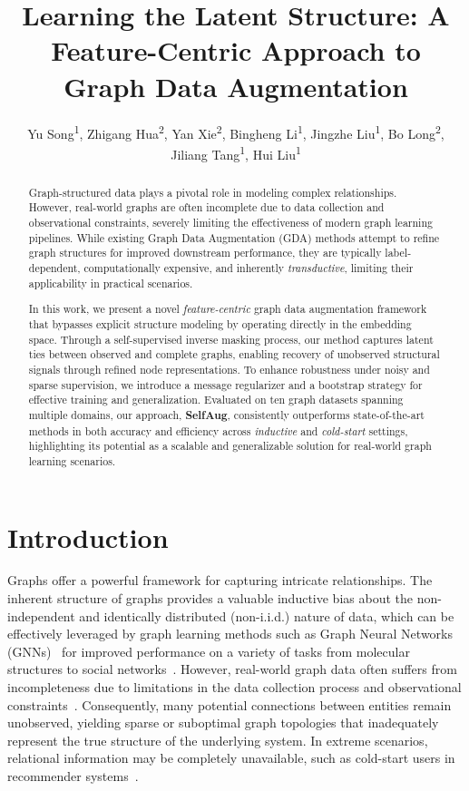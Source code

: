 \documentclass[letterpaper]{article} \usepackage{aaai2026}  \usepackage{times}  \usepackage{helvet}  \usepackage{courier}  \usepackage[hyphens]{url}  \usepackage{graphicx} \urlstyle{rm} \def\UrlFont{\rm}  \usepackage{natbib}  \usepackage{caption} \frenchspacing  \setlength{\pdfpagewidth}{8.5in}  \setlength{\pdfpageheight}{11in}
\title{Learning the Latent Structure: A Feature-Centric Approach to Graph Data Augmentation}
\author {
Yu Song\textsuperscript{\rm 1},
    Zhigang Hua\textsuperscript{\rm 2},
    Yan Xie\textsuperscript{\rm 2},
    Bingheng Li\textsuperscript{\rm 1},
    Jingzhe Liu\textsuperscript{\rm 1},
    Bo Long\textsuperscript{\rm 2},
    Jiliang Tang\textsuperscript{\rm 1},
    Hui Liu\textsuperscript{\rm 1}
}
\begin{document}
\maketitle

\begin{abstract}
Graph-structured data plays a pivotal role in modeling complex relationships. However, real-world graphs are often incomplete due to data collection and observational constraints, severely limiting the effectiveness of modern graph learning pipelines. While existing Graph Data Augmentation (GDA) methods attempt to refine graph structures for improved downstream performance, they are typically label-dependent, computationally expensive, and inherently \textit{transductive}, limiting their applicability in practical scenarios.

In this work, we present a novel \textit{feature-centric} graph data augmentation framework that bypasses explicit structure modeling by operating directly in the embedding space. Through a self-supervised inverse masking process, our method captures latent ties between observed and complete graphs, enabling recovery of unobserved structural signals through refined node representations. To enhance robustness under noisy and sparse supervision, we introduce a message regularizer and a bootstrap strategy for effective training and generalization.
Evaluated on ten graph datasets spanning multiple domains, our approach, \textbf{SelfAug}, consistently outperforms state-of-the-art methods in both accuracy and efficiency across \textit{inductive} and \textit{cold-start} settings, highlighting its potential as a scalable and generalizable solution for real-world graph learning scenarios.
\end{abstract}

\section{Introduction}
Graphs offer a powerful framework for capturing intricate relationships. The inherent structure of graphs provides a valuable inductive bias about the non-independent and identically distributed (non-i.i.d.) nature of data, which can be effectively leveraged by graph learning methods such as Graph Neural Networks (GNNs)~\cite{kipf2016semi, velivckovic2017graph, chien2020adaptive} for improved performance on a variety of tasks from molecular structures to social networks~\cite{fan2019graph, rong2020self, zhou2020graph}. However, real-world graph data often suffers from incompleteness due to limitations in the data collection process and observational constraints~\cite{li2023gslb, zheng2021cold, kim2024content}. Consequently, many potential connections between entities remain unobserved, yielding sparse or suboptimal graph topologies that inadequately represent the true structure of the underlying system. In extreme scenarios, relational information may be completely unavailable, such as cold-start users in recommender systems~\cite{chen2020esam, kim2024content}.
\end{document}
